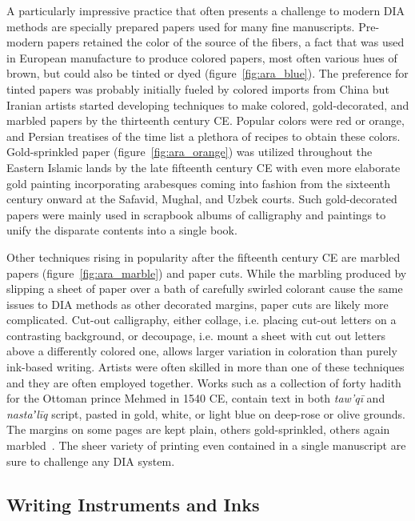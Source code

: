 A particularly impressive practice that often presents a challenge to modern
DIA methods are specially prepared papers used for many fine manuscripts.
Pre-modern papers retained the color of the source of the fibers, a fact that
was used in European manufacture to produce colored papers, most often various
hues of brown, but could also be tinted or dyed (figure~\ref{fig:ara_blue}).
The preference for tinted papers was probably initially fueled by colored
imports from China but Iranian artists started developing techniques to make
colored, gold-decorated, and marbled papers by the thirteenth century CE.
Popular colors were red or orange, and Persian treatises of the time list a
plethora of recipes to obtain these colors. Gold-sprinkled paper
(figure~\ref{fig:ara_orange}) was utilized throughout the Eastern Islamic lands
by the late fifteenth century CE with even more elaborate gold painting
incorporating arabesques coming into fashion from the sixteenth century onward
at the Safavid, Mughal, and Uzbek courts. Such gold-decorated papers were
mainly used in scrapbook albums of calligraphy and paintings to unify the
disparate contents into a single book. 

Other techniques rising in popularity after the fifteenth century CE are
marbled papers (figure~\ref{fig:ara_marble}) and paper cuts. While the marbling
produced by slipping a sheet of paper over a bath of carefully swirled colorant
cause the same issues to DIA methods as other decorated margins, paper cuts are
likely more complicated.  Cut-out calligraphy, either collage, i.e. placing
cut-out letters on a contrasting background, or decoupage, i.e. mount a sheet
with cut out letters above a differently colored one, allows larger variation
in coloration than purely ink-based writing. Artists were often skilled in more
than one of these techniques and they are often employed together. Works such
as a collection of forty hadith for the Ottoman prince Mehmed in 1540 CE,
contain text in both \emph{taw'qī} and \emph{nastaʼlīq} script, pasted in gold,
white, or light blue on deep-rose or olive grounds. The margins on some pages
are kept plain, others gold-sprinkled, others again marbled~\cite[pg.
52-56]{blair2006islamic}. The sheer variety of printing even contained in a
single manuscript are sure to challenge any DIA system.

\subsection{Writing Instruments and Inks}

